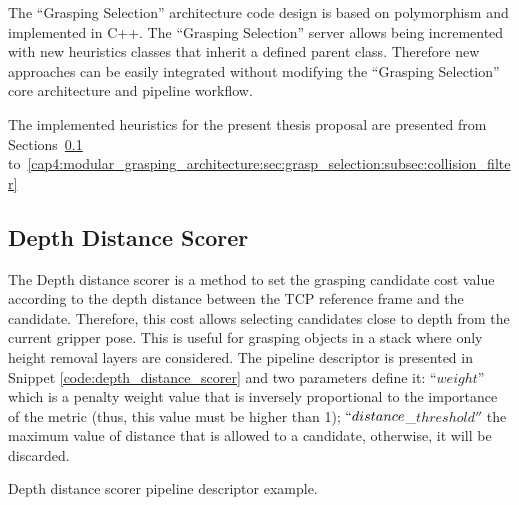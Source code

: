 The ``Grasping Selection'' architecture code design is based on polymorphism and implemented in C++. The ``Grasping Selection'' server allows being incremented with new heuristics classes that inherit a defined parent class. Therefore new approaches can be easily integrated without modifying the ``Grasping Selection'' core architecture and pipeline workflow.  



The implemented heuristics for the present thesis proposal are presented from Sections~\ref{cap4:modular_grasping_architecture:sec:grasp_selection:subsec:depth_distance} to~\ref{cap4:modular_grasping_architecture:sec:grasp_selection:subsec:collision_filter}

\subsection{Depth Distance Scorer}
\label{cap4:modular_grasping_architecture:sec:grasp_selection:subsec:depth_distance}

The Depth distance scorer is a method to set the grasping candidate cost value according to the depth distance between the TCP  reference frame and the candidate. Therefore, this cost allows selecting candidates close to depth from the current gripper pose. This is useful for grasping objects in a stack where only height removal layers are considered. The pipeline descriptor is presented in Snippet \ref{code:depth_distance_scorer} and two parameters define it: ``$weight$'' which is a penalty weight value that is inversely proportional to the importance of the metric (thus, this value must be higher than 1); $``distance$\_$threshold''$ the maximum value of distance that is allowed to a candidate, otherwise, it will be discarded.



\begin{snippet}[h!]
\centering
{}
\caption{Depth distance scorer pipeline descriptor example.}
\label{code:depth_distance_scorer}
\end{snippet}

